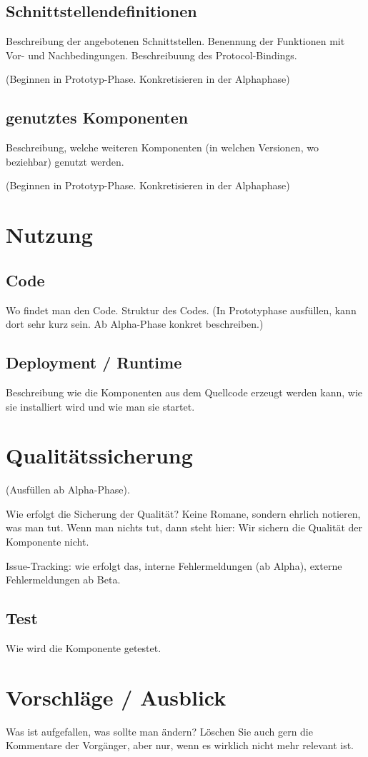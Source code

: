 \subsection{Schnittstellendefinitionen}
Beschreibung der angebotenen Schnittstellen. Benennung der Funktionen
mit Vor- und Nachbedingungen. Beschreibuung des Protocol-Bindings.

(Beginnen in Prototyp-Phase. Konkretisieren in der Alphaphase)

\subsection{genutztes Komponenten}
Beschreibung, welche weiteren Komponenten (in welchen Versionen, wo beziehbar) genutzt werden.

(Beginnen in Prototyp-Phase. Konkretisieren in der Alphaphase)

\section{Nutzung}
\subsection{Code}
Wo findet man den Code. Struktur des Codes. (In Prototyphase ausfüllen,
kann dort sehr kurz sein. Ab Alpha-Phase konkret beschreiben.)

\subsection{Deployment / Runtime}
Beschreibung wie die Komponenten aus dem Quellcode erzeugt werden kann,
wie sie installiert wird und wie man sie startet.

\section{Qualitätssicherung}
(Ausfüllen ab Alpha-Phase).

Wie erfolgt die Sicherung der Qualität? Keine Romane, sondern ehrlich notieren,
was man tut. Wenn man nichts tut, dann steht hier: Wir sichern die Qualität der
Komponente nicht.

Issue-Tracking: wie erfolgt das, interne Fehlermeldungen (ab Alpha), 
externe Fehlermeldungen ab Beta.

\subsection{Test}
Wie wird die Komponente getestet.

\section{Vorschläge / Ausblick}
Was ist aufgefallen, was sollte man ändern? Löschen Sie auch gern die Kommentare
der Vorgänger, aber nur, wenn es wirklich nicht mehr relevant ist.

